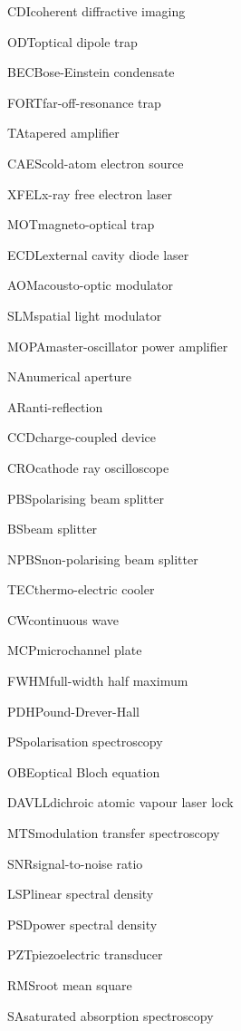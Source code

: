    {CDI}{coherent diffractive imaging}

    {ODT}{optical dipole trap}

    {BEC}{Bose-Einstein condensate}

    {FORT}{far-off-resonance trap}

    {TA}{tapered amplifier}

    {CAES}{cold-atom electron source}

    {XFEL}{x-ray free electron laser}

    {MOT}{magneto-optical trap}

    {ECDL}{external cavity diode laser}

    {AOM}{acousto-optic modulator}

    {SLM}{spatial light modulator}

    {MOPA}{master-oscillator power amplifier}

    {NA}{numerical aperture}

    {AR}{anti-reflection}

    {CCD}{charge-coupled device}

    {CRO}{cathode ray oscilloscope}

    {PBS}{polarising beam splitter}

    {BS}{beam splitter}

    {NPBS}{non-polarising beam splitter}

    {TEC}{thermo-electric cooler}

    {CW}{continuous wave}

    {MCP}{microchannel plate}

    {FWHM}{full-width half maximum}

    {PDH}{Pound-Drever-Hall}
    
    {PS}{polarisation spectroscopy}
    
    {OBE}{optical Bloch equation}
    
    {DAVLL}{dichroic atomic vapour laser lock}

    {MTS}{modulation transfer spectroscopy}

    {SNR}{signal-to-noise ratio}

    {LSP}{linear spectral density}
    
    {PSD}{power spectral density}
    
    {PZT}{piezoelectric transducer}

    {RMS}{root mean square}
    
    {SA}{saturated absorption spectroscopy}
    

